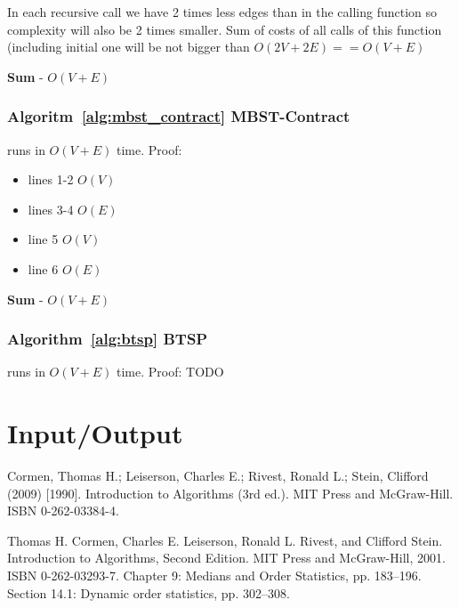 \documentclass[runningheads, a4paper]{llncs}
\begin{document}
In each recursive call we have 2 times less edges than in the calling function so complexity will also be 2 times smaller. Sum of costs of all calls of this function (including initial one will be not bigger than $O(2V + 2E) == O(V+E)$

\textbf{Sum} - $O(V + E)$
\subsubsection{Algoritm~\ref{alg:mbst_contract} MBST-Contract}
runs in $O(V+E)$ time. Proof:

\begin{itemize}
    \item lines 1-2 $O(V)$
    \item lines 3-4 $O(E)$
    \item line 5 $O(V)$
    \item line 6 $O(E)$
\end{itemize}

\textbf{Sum} - $O(V + E)$

\subsubsection{Algorithm~\ref{alg:btsp} BTSP}
runs in $O(V+E)$ time. Proof:
TODO
\section{Input/Output}


\begin{thebibliography}{4}
    
     Cormen, Thomas H.; Leiserson, Charles E.; Rivest, Ronald L.; Stein, Clifford (2009) [1990]. Introduction to Algorithms (3rd ed.). MIT Press and McGraw-Hill. ISBN 0-262-03384-4.
    
     Thomas H. Cormen, Charles E. Leiserson, Ronald L. Rivest, and Clifford Stein. Introduction to Algorithms, Second Edition. MIT Press and McGraw-Hill, 2001. ISBN 0-262-03293-7. Chapter 9: Medians and Order Statistics, pp. 183–196. Section 14.1: Dynamic order statistics, pp. 302–308.
\end{thebibliography}
        
    
\end{document}
